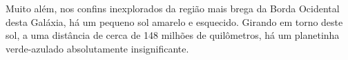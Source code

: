 \documentclass{article}
\begin{document}
  Muito       além, nos confins     inexplorados da região mais     brega da Borda Ocidental desta Galáxia, há um pequeno sol amarelo e esquecido.
  Girando em torno deste sol, a uma distância de cerca de 148 milhões de quilômetros, há um planetinha verde-azulado absolutamente insignificante.
\end{document}
